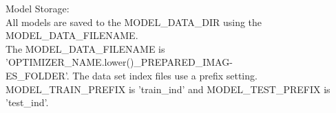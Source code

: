 Model Storage: \\
All models are saved to the MODEL\_DATA\_DIR using the MODEL\_DATA\_FILENAME. \\
The MODEL\_DATA\_FILENAME is '{OPTIMIZER\_NAME.lower()}\_{PREPARED\_IMAG- \\ ES\_FOLDER}'. The data set index files use a prefix setting. MODEL\_TRAIN\_PREFIX is 'train\_ind' and MODEL\_TEST\_PREFIX is 'test\_ind'. \\


